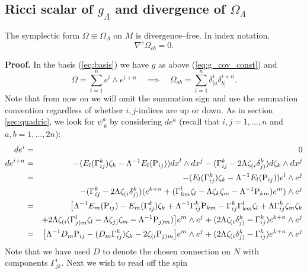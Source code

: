 \subsection{Ricci scalar of $g_\Lambda$ and divergence of $\Omega_\Lambda$}

\begin{lemma} \label{lem:div_free} The symplectic form $\Omega\equiv\Omega_\Lambda$ on $M$ is divergence--free. In index notation,
\[
\nabla^c\Omega_{cb}=0.
\]
\end{lemma}

{\bf Proof.} In the basis
(\ref{eq:basis}) we have $g$ as above (\ref{eq:g_cov_const})
and
\[
\Omega=\sum_{i=1}^{n}e^{i}\wedge e^{i+n}\quad\implies\quad\Omega_{ab}=\sum_{i=1}^{n}\delta_{[a}^{i}\delta_{b]}^{i+n}.
\]
Note that from now on we will omit the summation sign and use the
summation convention regardless of whether $i,j$-indices are up or
down. As in section \ref{sec:quadric}, we look for $\psi_{\ b}^{a}$
by considering $ de^{a}$ (recall that $i,j=1,\dots,n$ and
$a,b=1,\dots,2n$):
\begin{eqnarray*}
 de^{i} & = & 0\\
 de^{i+n} & = & -(E_{l}(\Gamma_{ij}^{k})\zeta_{k}-\Lambda^{-1}E_{l}(\mathrm{P}_{ij})) dx^{l}\wedge dx^{j}-(\Gamma_{ij}^{k}-2\Lambda \zeta_{(i}\delta_{j)}^{k}) d\zeta_{k}\wedge dx^{j}\\
 & = & -(E_{l}(\Gamma_{ij}^{k})\zeta_{k}-\Lambda^{-1}E_{l}(\mathrm{P}_{ij}))e^{l}\wedge e^{j}\\
 &  & -(\Gamma_{ij}^{k}-2\Lambda \zeta_{(i}\delta_{j)}^{k})(e^{k+n}+(\Gamma_{km}^{l}\zeta_{l}-\Lambda \zeta_{k}\zeta_{m}-\Lambda^{-1}\mathrm{P}_{km})e^{m})\wedge e^{j}\\
 & = & \bigl[\Lambda^{-1}E_{m}(\mathrm{P}_{ij})-E_{m}(\Gamma_{ij}^{k})\zeta_{k}+\Lambda^{-1}\Gamma_{ij}^{k}\mathrm{P}_{km}-\Gamma_{ij}^{k}\Gamma_{km}^{l}\zeta_{l}+\Lambda\Gamma_{ij}^{k}\zeta_{m}\zeta_{k}\\
 &  & +2\Lambda \zeta_{(i}(\Gamma_{j)m}^{l}\zeta_{l}-\Lambda \zeta_{j)}\zeta_{m}-\Lambda^{-1}\mathrm{P}_{j)m})\bigr]e^{m}\wedge e^{j}+(2\Lambda \zeta_{(i}\delta_{j)}^{k}-\Gamma_{ij}^{k})e^{k+n}\wedge e^{j}\\
 & = & \bigl[\Lambda^{-1}D_{m}\mathrm{P}_{ij}-(D_{m}\Gamma_{ij}^{k})\zeta_{k}-2\zeta_{(i}\mathrm{P}_{j)m}\bigr]e^{m}\wedge e^{j}+(2\Lambda \zeta_{(i}\delta_{j)}^{k}-\Gamma_{ij}^{k})e^{k+n}\wedge e^{j}\\
\end{eqnarray*}
Note that we have used $D$ to denote the chosen connection on $N$
with components $\Gamma_{jk}^{i}$. Next we wish to read off the spin
